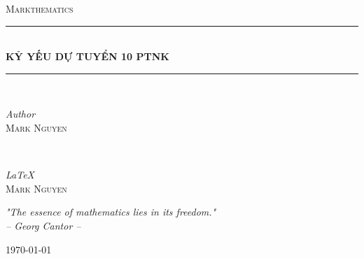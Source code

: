 \begin{titlepage}

    \newcommand{\HRule}{\rule{\linewidth}{0.5mm}} 
    \center
    
    
    \textsc{\LARGE Markthematics}\\[5cm]
    
    
    \HRule\\[0.4cm]
    
    {\huge\bfseries KỶ YẾU DỰ TUYỂN 10 PTNK}\\[0.1cm]
    
    \HRule\\[1.5cm]
    
    
    \begin{minipage}{0.4\textwidth}
        \begin{flushleft}
            \large
            \textit{Author}\\
            \textsc{Mark Nguyen}
        \end{flushleft}
    \end{minipage}
    ~
    \begin{minipage}{0.4\textwidth}
        \begin{flushright}
            \large
            \textit{\LaTeX}\\
            \textsc{Mark Nguyen}
        \end{flushright}
    \end{minipage}
    

    \vfill\vfill

    \textit{"The essence of mathematics lies in its freedom."}\\[0.25cm]
    \textit{-- Georg Cantor --}
    
    
    \vfill\vfill\vfill
    {\large\today}

    \vfill
    
\end{titlepage}